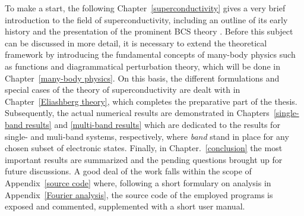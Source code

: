 To make a start, the following Chapter~\ref{superconductivity} gives a very
brief introduction to the field of superconductivity, including an outline of
its early history and the presentation of the prominent BCS theory \cites
{BardeenCooperSchrieffer57a} {BardeenCooperSchrieffer57b}. Before this subject
can be discussed in more detail, it is necessary to extend the theoretical
framework by introducing the fundamental concepts of many-body physics such as
 functions and diagrammatical perturbation theory, which will be
done in Chapter~\ref{many-body physics}. On this basis, the different
formulations and special cases of the  theory of
superconductivity are dealt with in Chapter~\ref{Eliashberg theory}, which
completes the preparative part of the thesis. Subsequently, the actual numerical
results are demonstrated in Chapters~\ref{single-band results} and
\ref{multi-band results} which are dedicated to the results for single- and
muli-band systems, respectively, where \emph{band} stand in place for any chosen
subset of electronic states. Finally, in Chapter.~\ref{conclusion} the most
important results are summarized and the pending questions brought up for future
discussions. A good deal of the work falls within the scope of
Appendix~\ref{source code} where, following a short formulary on 
analysis in Appendix~\ref{Fourier analysis}, the source code of the employed
programs is exposed and commented, supplemented with a short user manual.
